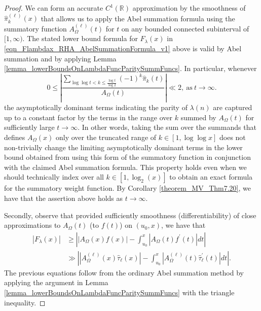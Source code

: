 \documentclass[11pt,reqno,a4letter]{article}
\numberwithin{figure}{section}
\numberwithin{table}{section}
\theoremstyle{plain}
\numberwithin{theorem}{section}
\theoremstyle{definition}
\begin{document}
\begin{proof} 
We can form an accurate $C^{1}(\mathbb{R})$ approximation by the smoothness of 
$\widehat{\pi}_k^{(\ell)}(x)$ that allows us to apply the Abel summation formula using the summatory 
function $A_{\Omega}^{(\ell)}(t)$ for $t$ on any bounded connected subinterval of $[1, \infty)$. 
The stated lower bound formula for $F_{\lambda}(x)$ in 
\eqref{eqn_Flambdax_RHA_AbelSummationFormula_v1} 
above is valid by Abel summation and by 
applying Lemma \ref{lemma_lowerBoundsOnLambdaFuncParitySummFuncs}. 
In particular, whenever 
\[
0 \leq \left\lvert \frac{\displaystyle\sum\limits_{\log\log t < k \leq \frac{\log t}{\log 2}} 
     (-1)^k \widehat{\pi}_k(t)}{A_{\Omega}(t)}\right\rvert \ll 2, 
     \mathrm{\ as\ } t \rightarrow \infty. 
\]
the asymptotically dominant terms indicating the parity of 
$\lambda(n)$ are captured up to a constant factor 
by the terms in the range over $k$ summed by $A_{\Omega}(t)$ for 
sufficiently large $t \rightarrow \infty$. 
In other words, taking the sum over the summands that defines $A_{\Omega}(x)$ only over the truncated range of 
$k \in [1, \log\log x]$ does not non-trivially change the limiting asymptotically 
dominant terms in the lower bound obtained from using this form of the summatory function in 
conjunction with the claimed Abel summation formula. 
This property holds even when we should technically 
index over all $k \in [1, \log_2(x)]$ to obtain an exact formula for the summatory weight function.  
By Corollary \ref{theorem_MV_Thm7.20}, we have that 
the assertion above holds as $t \rightarrow \infty$. 

Secondly, observe that provided sufficiently smoothness (differentiability) of 
close approximations to $A_{\Omega}(t)$ (to $f(t)$) on $(u_0, x)$, we have that 
\begin{align*} 
|F_{\lambda}(x)| & \geq \left\lvert |A_{\Omega}(x) f(x)| - \int_{u_0}^{x} 
     |A_{\Omega}(t) f^{\prime}(t)| dt \right\rvert \\ 
     & \gg \left\lvert |A_{\Omega}^{(\ell)} (x) \widehat{\tau}_{\ell}(x)| - \int_{u_0}^{x} 
     |A_{\Omega}^{(\ell)}(t) \widehat{\tau}_{\ell}^{\prime}(t)| dt \right\rvert. 
\end{align*} 
The previous equations follow from the ordinary Abel summation method by 
applying the argument in 
Lemma \ref{lemma_lowerBoundsOnLambdaFuncParitySummFuncs} with the triangle inequality. 
\end{proof} 
\end{document}
